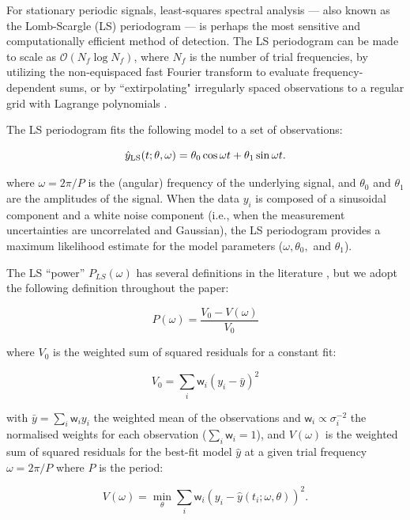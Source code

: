 \documentclass[apj]{emulateapj}
\newcommand{\bigO}{\mathcal{O}}
\newcommand{\wgt}{\mathsf{w}}  %
\begin{document}
For stationary periodic signals, least-squares spectral analysis --- also known as
the Lomb-Scargle (LS) periodogram \citep{Lomb_1976,Scargle_1982,Barning_1963,Vanicek_1971} ---
is perhaps the most sensitive and computationally efficient method of detection. The LS periodogram
can be made to scale as $\bigO(N_f\log N_f)$, where $N_f$ is the number of trial frequencies, by
utilizing the non-equispaced fast Fourier transform \citep[][NFFT]{NFFT_KKD2009,NFFT_DR1993} to evaluate frequency-dependent
sums, or by ``extirpolating" irregularly spaced observations to a regular grid with Lagrange polynomials \citep{Press+Rybicki_1989}.

The LS periodogram fits the following model to a set of observations:

\begin{equation}
    \hat{y}_{\rm LS}(t;\theta, \omega) = \theta_0\cos{\omega t} + \theta_1\sin{\omega t}.
\end{equation}

where $\omega = 2\pi / P$ is the (angular) frequency of the underlying signal, and $\theta_0$ and
$\theta_1$ are the amplitudes of the signal. When the data $y_i$ is composed of a sinusoidal
component and a white noise component (i.e., when the measurement uncertainties are uncorrelated and
Gaussian), the LS periodogram provides a maximum likelihood estimate for the model parameters ($\omega, \theta_0,$ and
$\theta_1$).

The LS ``power'' $P_{LS}(\omega)$ has several definitions
in the literature \citep{Zechmeister+Kurster_2009}, but we adopt the following definition throughout the paper:

\begin{equation}
\label{eq:lsp}
P(\omega) = \frac{V_0 - V(\omega)}{V_0}
\end{equation}

where $V_0$ is the weighted sum of squared residuals for a constant fit:

\begin{equation}
V_0 = \sum_i \wgt_i (y_i - \bar{y})^2
\end{equation}

with $\bar{y} = \sum_i \wgt_i y_i$ the weighted mean of the observations and
$\wgt_i \propto \sigma_i^{-2}$ the normalised weights for each observation
($\sum_i \wgt_i = 1$), and $V(\omega)$ is the weighted sum of squared residuals
for the best-fit model $\hat{y}$ at a given trial frequency
$\omega = 2\pi / P$ where $P$ is the period:

\begin{equation}
V(\omega) = \min_{\theta} \sum_i \wgt_i (y_i - \hat{y}(t_i; \omega, \theta))^2.
\end{equation}
\end{document}

